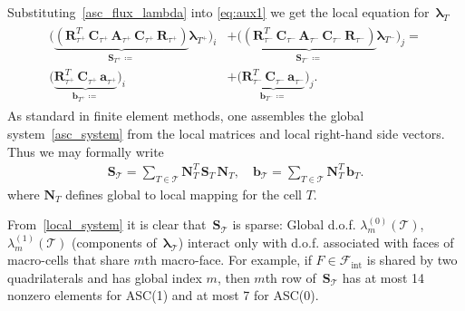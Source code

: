 \documentclass[12pt]{article}
\newcommand{\vect}[1]{\boldsymbol{\mathbf{#1}}}
\newcommand{\bcell}{T}
\newcommand{\bmesh}{{\vect{\mathcal T}}}
\newcommand{\mmesh}{{\vect{\mathcal \tau}}}
\newcommand{\bfaces}[1][]{{\vect{\mathcal F}_{\text{#1}}}}
\begin{document}
	Substituting~\eqref{asc_flux_lambda} into \eqref{eq:aux1} we get the local equation for~${\vect \lambda}_\bcell$
	\begin{align}\label{local_system}
		\begin{split}
			\Big( \underbrace{\left( \vect R^T_{\mmesh^+}\,\vect C_{\mmesh^+}\,\vect A_{\mmesh^+}\,\vect C_{\mmesh^+}\,\vect R_{\mmesh^+} \right)}_{\vect S_{\bcell^+} \coloneqq} {\vect \lambda}_{\bcell^+} \Big)_i
			&+
			\Big( \underbrace{\left( \vect R^T_{\mmesh^-}\,\vect C_{\mmesh^-}\,\vect A_{\mmesh^-}\,\vect C_{\mmesh^-}\,\vect R_{\mmesh^-} \right)}_{\vect S_{\bcell^-} \coloneqq} {\vect \lambda}_{\bcell^-} \Big)_j = \\
			\big( \underbrace{\vect R^T_{\mmesh^+}\,\vect C_{\mmesh^+}\,{\vect a}_{\mmesh^+}}_{{\vect b}_{\bcell^+} \coloneqq} \big)_i
			&+
			\big( \underbrace{\vect R^T_{\mmesh^-}\,\vect C_{\mmesh^-}\,{\vect a}_{\mmesh^-}}_{{\vect b}_{\bcell^-} \coloneqq} \big)_j.
		\end{split}
	\end{align}
	As standard in finite element methods, one assembles the global system~\eqref{asc_system} from the local matrices and local right-hand side vectors.  Thus we may formally write
	\begin{align}\label{global_system_assembly}
		\vect S_\bmesh = \sum_{\bcell \in \bmesh} \vect N^T_\bcell\,\vect S_\bcell\,\vect N_\bcell, \quad
		{\vect b}_\bmesh = \sum_{\bcell \in \bmesh} \vect N^T_\bcell\,{\vect b}_\bcell.
	\end{align}
	where $\vect N_\bcell$ defines global to local mapping for the cell $T$.
	
	From~\eqref{local_system} it is clear that~$\vect S_\bmesh$ is sparse: Global d.o.f. $\lambda^{(0)}_m(\bmesh)$, $\lambda^{(1)}_m(\bmesh)$ (components of~$\vect\lambda_\bmesh$) interact only with d.o.f. associated with faces of macro-cells that share $m$th macro-face. For example, if $F\in\bfaces[int]$ is shared by two quadrilaterals and has global index $m$, then $m$th row of~$\vect S_\bmesh$ has at most 14 nonzero elements for ASC(1) and at most 7 for ASC(0). %
	
\end{document}
